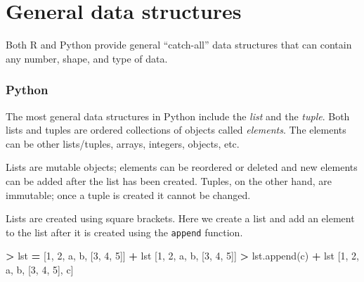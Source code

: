 \documentclass[
]{book}
\newenvironment{Shaded}{\begin{snugshade}}{\end{snugshade}}
\newcommand{\DecValTok}[1]{\textcolor[rgb]{0.00,0.00,0.81}{#1}}
\newcommand{\NormalTok}[1]{#1}
\newcommand{\OperatorTok}[1]{\textcolor[rgb]{0.81,0.36,0.00}{\textbf{#1}}}
\newcommand{\StringTok}[1]{\textcolor[rgb]{0.31,0.60,0.02}{#1}}
\begin{document}
\hypertarget{general-data-structures}{%
\section{General data structures}\label{general-data-structures}}

Both R and Python provide general ``catch-all'' data structures that can contain any number, shape, and type of data.

\hypertarget{python-11}{%
\subsubsection*{Python}\label{python-11}}

The most general data structures in Python include the \emph{list} and the \emph{tuple}. Both lists and tuples are ordered collections of objects called \emph{elements}. The elements can be other lists/tuples, arrays, integers, objects, etc.

Lists are mutable objects; elements can be reordered or deleted and new elements can be added after the list has been created. Tuples, on the other hand, are immutable; once a tuple is created it cannot be changed.

Lists are created using square brackets. Here we create a list and add an element to the list after it is created using the \texttt{append} function.

\begin{Shaded}
\begin{Highlighting}[]
\OperatorTok{\textgreater{}}\NormalTok{ lst }\OperatorTok{=}\NormalTok{ [}\DecValTok{1}\NormalTok{, }\DecValTok{2}\NormalTok{, }\StringTok{\textquotesingle{}a\textquotesingle{}}\NormalTok{, }\StringTok{\textquotesingle{}b\textquotesingle{}}\NormalTok{, [}\DecValTok{3}\NormalTok{, }\DecValTok{4}\NormalTok{, }\DecValTok{5}\NormalTok{]]}
\OperatorTok{+}\NormalTok{ lst }
\NormalTok{[}\DecValTok{1}\NormalTok{, }\DecValTok{2}\NormalTok{, }\StringTok{\textquotesingle{}a\textquotesingle{}}\NormalTok{, }\StringTok{\textquotesingle{}b\textquotesingle{}}\NormalTok{, [}\DecValTok{3}\NormalTok{, }\DecValTok{4}\NormalTok{, }\DecValTok{5}\NormalTok{]]}
\OperatorTok{\textgreater{}}\NormalTok{ lst.append(}\StringTok{\textquotesingle{}c\textquotesingle{}}\NormalTok{)}
\OperatorTok{+}\NormalTok{ lst}
\NormalTok{[}\DecValTok{1}\NormalTok{, }\DecValTok{2}\NormalTok{, }\StringTok{\textquotesingle{}a\textquotesingle{}}\NormalTok{, }\StringTok{\textquotesingle{}b\textquotesingle{}}\NormalTok{, [}\DecValTok{3}\NormalTok{, }\DecValTok{4}\NormalTok{, }\DecValTok{5}\NormalTok{], }\StringTok{\textquotesingle{}c\textquotesingle{}}\NormalTok{]}
\end{Highlighting}
\end{Shaded}
\end{document}
